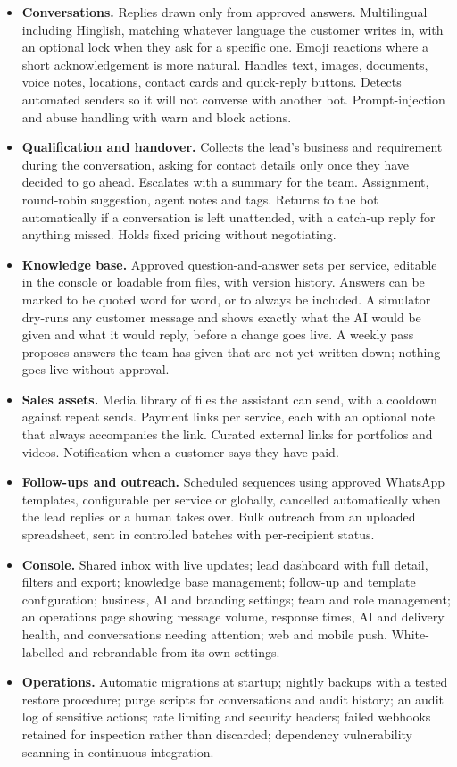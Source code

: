 \documentclass[10pt,a4paper]{article}
\begin{document}
\begin{itemize}
\item \textbf{Conversations.} Replies drawn only from approved answers.
Multilingual including Hinglish, matching whatever language the customer
writes in, with an optional lock when they ask for a specific one. Emoji
reactions where a short acknowledgement is more natural. Handles text, images,
documents, voice notes, locations, contact cards and quick-reply buttons.
Detects automated senders so it will not converse with another bot.
Prompt-injection and abuse handling with warn and block actions.
\item \textbf{Qualification and handover.} Collects the lead's business and
requirement during the conversation, asking for contact details only once they
have decided to go ahead. Escalates with a summary for the team. Assignment,
round-robin suggestion, agent notes and tags. Returns to the bot automatically
if a conversation is left unattended, with a catch-up reply for anything
missed. Holds fixed pricing without negotiating.
\item \textbf{Knowledge base.} Approved question-and-answer sets per service,
editable in the console or loadable from files, with version history. Answers
can be marked to be quoted word for word, or to always be included. A simulator
dry-runs any customer message and shows exactly what the AI would be given and
what it would reply, before a change goes live. A weekly pass proposes answers
the team has given that are not yet written down; nothing goes live without
approval.
\item \textbf{Sales assets.} Media library of files the assistant can send,
with a cooldown against repeat sends. Payment links per service, each with an
optional note that always accompanies the link. Curated external links for
portfolios and videos. Notification when a customer says they have paid.
\item \textbf{Follow-ups and outreach.} Scheduled sequences using approved
WhatsApp templates, configurable per service or globally, cancelled
automatically when the lead replies or a human takes over. Bulk outreach from
an uploaded spreadsheet, sent in controlled batches with per-recipient status.
\item \textbf{Console.} Shared inbox with live updates; lead dashboard with
full detail, filters and export; knowledge base management; follow-up and
template configuration; business, AI and branding settings; team and role
management; an operations page showing message volume, response times, AI and
delivery health, and conversations needing attention; web and mobile push.
White-labelled and rebrandable from its own settings.
\item \textbf{Operations.} Automatic migrations at startup; nightly backups
with a tested restore procedure; purge scripts for conversations and audit
history; an audit log of sensitive actions; rate limiting and security headers;
failed webhooks retained for inspection rather than discarded; dependency
vulnerability scanning in continuous integration.
\end{itemize}
\end{document}
